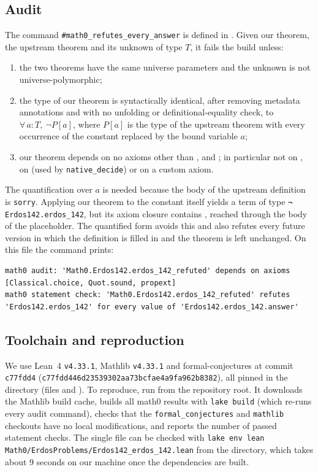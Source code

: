 \documentclass[11pt]{amsart}
\theoremstyle{plain}
\theoremstyle{definition}
\begin{document}
\subsection*{Audit}
The command \texttt{\#math0\_refutes\_every\_answer} is defined in . Given our theorem, the upstream theorem  and its unknown  of type $T$, it fails the build unless:
\begin{enumerate}
\item the two theorems have the same universe parameters and the unknown is not universe-polymorphic;
\item the type of our theorem is syntactically identical, after removing metadata annotations and with no unfolding or definitional-equality check, to $\forall\, a : T,\ \neg P[a]$, where $P[a]$ is the type of the upstream theorem with every occurrence of the constant  replaced by the bound variable $a$;
\item our theorem depends on no axioms other than ,  and ; in particular not on , on  (used by \texttt{native\_decide}) or on a custom axiom.
\end{enumerate}
The quantification over $a$ is needed because the body of the upstream definition is \texttt{sorry}. Applying our theorem to the constant itself yields a term of type \texttt{¬ Erdos142.erdos\_142}, but its axiom closure contains , reached through the body of the placeholder. The quantified form avoids this and also refutes every future version in which the definition is filled in and the theorem is left unchanged. On this file the command prints:
\begin{lstlisting}
math0 audit: 'Math0.Erdos142.erdos_142_refuted' depends on axioms [Classical.choice, Quot.sound, propext]
math0 statement check: 'Math0.Erdos142.erdos_142_refuted' refutes 'Erdos142.erdos_142' for every value of 'Erdos142.erdos_142.answer'
\end{lstlisting}

\subsection*{Toolchain and reproduction}
We use Lean~4 \cite{Lean4} \texttt{v4.33.1}, Mathlib \cite{Mathlib} \texttt{v4.33.1} and formal-conjectures \cite{FC} at commit \texttt{c77fdd4} (\texttt{c77fdd446d23539302aa73bcfae4a9fa962b8382}), all pinned in the  directory (files  and ). To reproduce, run  from the repository root. It downloads the Mathlib build cache, builds all math0 results with \texttt{lake build} (which re-runs every audit command), checks that the \texttt{formal\_conjectures} and \texttt{mathlib} checkouts have no local modifications, and reports the number of passed statement checks. The single file can be checked with \texttt{lake env lean Math0/ErdosProblems/Erdos142\_erdos\_142.lean} from the  directory, which takes about 9 seconds on our machine once the dependencies are built.
\end{document}
